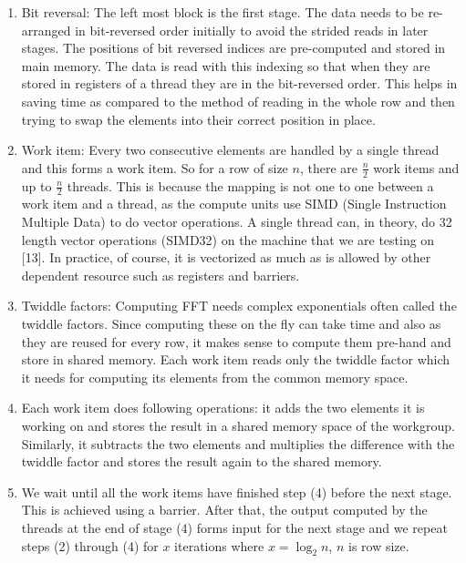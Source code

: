 \documentclass[sigconf]{acmart}
\begin{document}
\begin{enumerate}
\item Bit reversal: The left most block is the first stage. The data needs to be re-arranged in bit-reversed order initially to avoid the strided reads in later stages. The positions of bit reversed indices are pre-computed and stored in main memory. The data is read with this indexing so that when they are stored in registers of a thread they are in the bit-reversed order. This helps in saving time as compared to the method of reading in the whole row and then trying to swap the elements into their correct position in place.
\item Work item: Every two consecutive elements are handled by a single thread and this forms a work item. So for a row of size $n$, there are $\frac{n}{2}$ work items and up to $\frac{n}{2}$ threads. This is because the mapping is not one to one between a work item and a thread, as the compute units use SIMD (Single Instruction Multiple Data) to do vector operations. A single thread can, in theory, do 32 length vector operations (SIMD32) on the machine that we are testing on [13]. In practice, of course, it is vectorized as much as is allowed by other dependent resource such as registers and barriers.
\item Twiddle factors: Computing FFT needs complex exponentials often called the twiddle factors. Since computing these on the fly can take time and also as they are reused for every row, it makes sense to compute them pre-hand and store in shared memory. Each work item reads only the twiddle factor which it needs for computing its elements from the common memory space. 
\item Each work item does following operations: it adds the two elements it is working on and stores the result in a shared memory space of the workgroup. Similarly, it subtracts the two elements and multiplies the difference with the twiddle factor and stores the result again to the shared memory.
\item We wait until all the work items have finished step (4) before the next stage. This is achieved using a barrier. After that, the output computed by the threads at the end of stage (4) forms input for the next stage and we repeat steps (2) through (4) for $x$ iterations where $ x = \log _2 n $, $n$ is row size.	
\end{enumerate}
\end{document}
